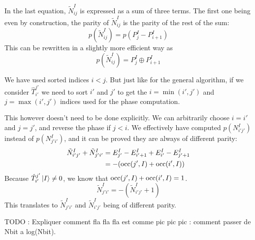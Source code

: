 \documentclass[./thesis.tex]{subfiles}
\begin{document}
In the last equation, $\tilde N^I_{ij}$ is expressed as a sum of three terms. The first one being even by construction, the parity of $\tilde N^I_{ij}$ is the parity of the rest of the sum:
\begin{equation}
p(\tilde N^I_{ij})=p(P^I_j - P^I_{i+1})
\end{equation}
This can be rewritten in a slightly more efficient way as
\begin{equation}
p(\tilde N^I_{ij}) = P^I_j \oplus P^I_{i+1}
\end{equation}


We have used sorted indices $i<j$. But just like for the general algorithm, if we consider $\hat T_{i'}^{j'}$ we need to sort $i'$ and $j'$ to get the $i=\min(i', j')$ and $j=\max(i', j')$ indices used for the phase computation.

This however doesn't need to be done explicitly. We can arbitrarily choose $i=i'$ and $j=j'$, and reverse the phase if $j<i$. We effectively have computed $p(N^I_{i'j'})$ instead of $p(N^I_{j'i'})$, and it can be proved they are always of different parity:
\begin{align}
\tilde N^{I}_{i' j'} + \tilde N^{I}_{j'i'} & = E^{I}_{j'} - E^I_{i'+1} + E^I_{i'} - E^I_{j'+1} \\
& = -\qty( {\text{occ}(j',I)} + {\text{occ}(i',I)})
\end{align}
Because $\hat T_{i'}^{j'} \ket I \neq 0$, we know that ${\text{occ}(j',I)} + {\text{occ}(i',I)} = 1$. 
\begin{equation}
\tilde N^{I}_{j' i'} = -(\tilde N^{I}_{i'j'} + 1)
\end{equation}
This translates to $\tilde N^{I}_{j' i'}$ and $\tilde N^{I}_{i'j'}$ being of different parity.

\alert{TODO : Expliquer comment fla fla fla est comme pic pic pic : comment passer de Nbit a log(Nbit).}
\end{document}
